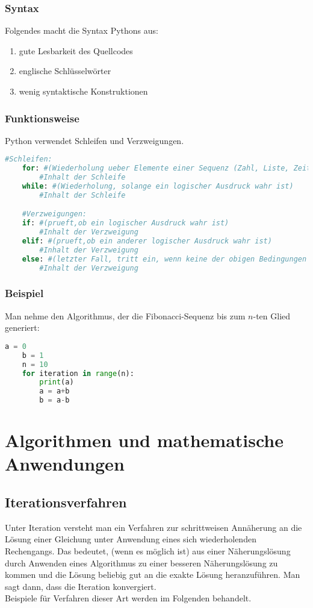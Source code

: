 \subsubsection{Syntax}
Folgendes macht die Syntax Pythons aus:\\
\begin{enumerate}
\item gute Lesbarkeit des Quellcodes
\item englische Schlüsselwörter
\item wenig syntaktische Konstruktionen
\end{enumerate}

\subsubsection{Funktionsweise}
Python verwendet Schleifen und Verzweigungen.\\
\begin{lstlisting}[language=Python]
	#Schleifen:
	for: #(Wiederholung ueber Elemente einer Sequenz (Zahl, Liste, Zeit...))
		#Inhalt der Schleife
	while: #(Wiederholung, solange ein logischer Ausdruck wahr ist)
		#Inhalt der Schleife

	#Verzweigungen:
	if: #(prueft,ob ein logischer Ausdruck wahr ist)
		#Inhalt der Verzweigung
	elif: #(prueft,ob ein anderer logischer Ausdruck wahr ist)
		#Inhalt der Verzweigung
	else: #(letzter Fall, tritt ein, wenn keine der obigen Bedingungen erfuellt wurde)
		#Inhalt der Verzweigung
\end{lstlisting}
\subsubsection{Beispiel}
Man nehme den Algorithmus, der die Fibonacci-Sequenz bis zum $n$-ten Glied generiert:\\
\begin{lstlisting}[language=Python]
	a = 0
	b = 1
	n = 10
	for iteration in range(n):
		print(a)
		a = a+b
		b = a-b
\end{lstlisting}
\section{Algorithmen und mathematische Anwendungen}
\subsection{Iterationsverfahren}
Unter Iteration versteht man ein Verfahren zur schrittweisen Annäherung an die Lösung einer Gleichung unter Anwendung eines sich wiederholenden Rechengangs. Das bedeutet, (wenn es möglich ist) aus einer Näherungslösung durch Anwenden eines Algorithmus zu einer besseren Näherungslösung zu kommen und die Lösung beliebig gut an die exakte Lösung heranzuführen. Man sagt dann, dass die Iteration konvergiert.\\
Beispiele für Verfahren dieser Art werden im Folgenden behandelt.
